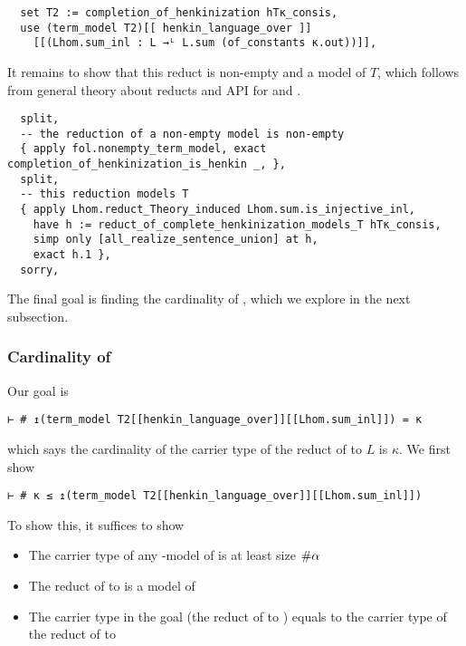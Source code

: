 \begin{lstlisting}
  set T2 := completion_of_henkinization hTκ_consis,
  use (term_model T2)[[ henkin_language_over ]]
    [[(Lhom.sum_inl : L →ᴸ L.sum (of_constants κ.out))]], \end{lstlisting}

It remains to show that this reduct is non-empty and a model of $T$,
which follows from general theory about reducts and API for
 and .

\begin{lstlisting}
  split,
  -- the reduction of a non-empty model is non-empty
  { apply fol.nonempty_term_model, exact completion_of_henkinization_is_henkin _, },
  split,
  -- this reduction models T
  { apply Lhom.reduct_Theory_induced Lhom.sum.is_injective_inl,
    have h := reduct_of_complete_henkinization_models_T hTκ_consis,
    simp only [all_realize_sentence_union] at h,
    exact h.1 },
  sorry, \end{lstlisting}

The final goal is finding the cardinality of ,
which we explore in the next subsection.

\subsubsection{Cardinality of }

Our goal is
\begin{lstlisting}
⊢ # ↥(term_model T2[[henkin_language_over]][[Lhom.sum_inl]]) = κ \end{lstlisting}
which says the cardinality of the carrier type of the
reduct of  to $L$ is $\kappa$.
We first show
\begin{lstlisting}
⊢ # κ ≤ ↥(term_model T2[[henkin_language_over]][[Lhom.sum_inl]]) \end{lstlisting}
To show this, it suffices to show
\begin{itemize}
  \item The carrier type of any -model of
         is at least size $\# \alpha$
  \item The reduct of  to
         is a model of
  \item The carrier type in the goal (the reduct of  to )
        equals to the carrier type of the reduct of  to
\end{itemize}

